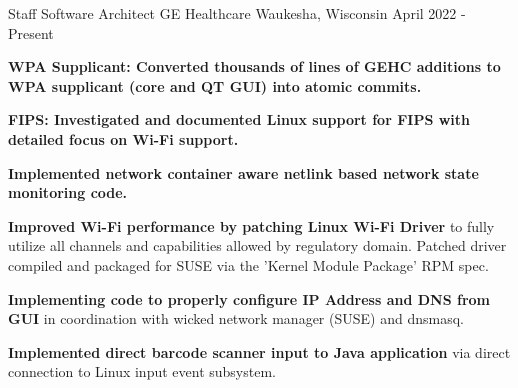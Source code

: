 

\begin{cventries}

  \cventry
    {Staff Software Architect} %
    {GE Healthcare} %
    {Waukesha, Wisconsin} %
    {April 2022 - Present} %
    {
      \begin{cvitems} %
      \item {\textbf{WPA Supplicant: Converted thousands of lines of GEHC additions to WPA supplicant (core and QT GUI) into atomic commits.}}
      \item {\textbf{FIPS: Investigated and documented Linux support for FIPS with detailed focus on Wi-Fi support.}}
      \item {\textbf{Implemented network container aware netlink based network state monitoring code.}}
      \item {\textbf{Improved Wi-Fi performance by patching Linux Wi-Fi Driver} to fully utilize all channels and capabilities allowed by regulatory domain. Patched driver compiled and packaged for SUSE via the 'Kernel Module Package' RPM spec.}
      \item {\textbf{Implementing code to properly configure IP Address and DNS from GUI} in coordination with wicked network manager (SUSE) and dnsmasq.}
      \item {\textbf{Implemented direct barcode scanner input to Java application} via direct connection to Linux input event subsystem.}
      \end{cvitems}
    }


\end{cventries}
